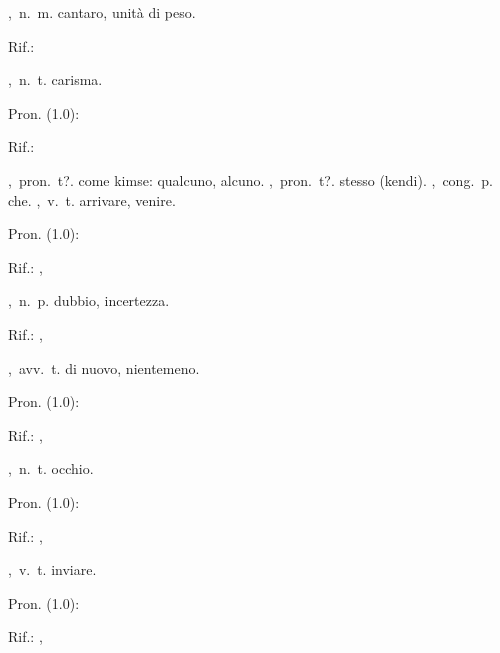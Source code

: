 ,\ n.\ m.
cantaro, unità di peso.
\begin{subvocedue}
\item[Rif.:] 
\end{subvocedue}
,\ n.\ t.
carisma.
\begin{subvocedue}
\item[Pron. (1.0):] 
\item[Rif.:] 
\end{subvocedue}
,\ pron.\ t?.
come kimse: qualcuno, alcuno.
,\ pron.\ t?.
stesso (kendi).
,\ cong.\ p.
che.
,\ v.\ t.
arrivare, venire.
\begin{subvocedue}
\item[Pron. (1.0):] 
\item[Rif.:] , 
\end{subvocedue}
,\ n.\ p.
dubbio, incertezza.
\begin{subvocedue}
\item[Rif.:] , 
\end{subvocedue}
,\ avv.\ t.
di nuovo, nientemeno.
\begin{subvocedue}
\item[Pron. (1.0):] 
\item[Rif.:] , 
\end{subvocedue}
,\ n.\ t.
occhio.
\begin{subvocedue}
\item[Pron. (1.0):] 
\item[Rif.:] , 
\end{subvocedue}
,\ v.\ t.
inviare.
\begin{subvocedue}
\item[Pron. (1.0):] 
\item[Rif.:] , 
\end{subvocedue}
